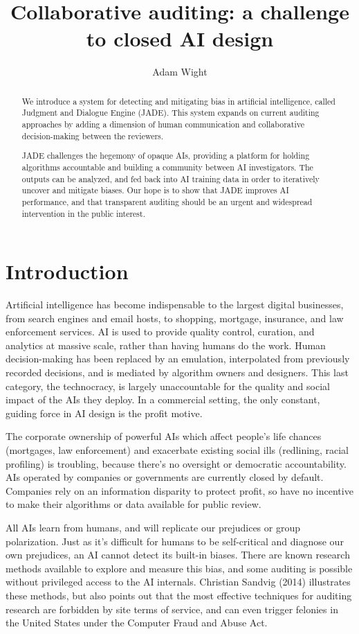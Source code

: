 \documentclass[format=sigconf, authorversion]{acmart}
\title{Collaborative auditing: a challenge to closed AI design}
\author{Adam Wight}
\affiliation{Wikimedia Foundation}
\begin{document}
\begin{abstract}
We introduce a system for detecting and mitigating bias in artificial intelligence, called Judgment and Dialogue Engine (JADE).  This system expands on current auditing approaches by adding a dimension of human communication and collaborative decision-making between the reviewers.

JADE challenges the hegemony of opaque AIs, providing a platform for holding algorithms accountable and building a community between AI investigators.  The outputs can be analyzed, and fed back into AI training data in order to iteratively uncover and mitigate biases.  Our hope is to show that JADE improves AI performance, and that transparent auditing should be an urgent and widespread intervention in the public interest.
\end{abstract}

\maketitle

\section{Introduction}

Artificial intelligence has become indispensable to the largest digital businesses, from search engines and email hosts, to shopping, mortgage, insurance, and law enforcement services.  AI is used to provide quality control, curation, and analytics at massive scale, rather than having humans do the work.  Human decision-making has been replaced by an emulation, interpolated from previously recorded decisions, and is mediated by algorithm owners and designers.  This last category, the technocracy, is largely unaccountable for the quality and social impact of the AIs they deploy.  In a commercial setting, the only constant, guiding force in AI design is the profit motive.

The corporate ownership of powerful AIs which affect people's life chances (mortgages, law enforcement) and exacerbate existing social ills (redlining, racial profiling) is troubling, because there's no oversight or democratic accountability.  AIs operated by companies or governments are currently closed by default.  Companies rely on an information disparity to protect profit, so have no incentive to make their algorithms or data available for public review.

All AIs learn from humans, and will replicate our prejudices or group polarization.  Just as it's difficult for humans to be self-critical and diagnose our own prejudices, an AI cannot detect its built-in biases.  There are known research methods available to explore and measure this bias, and some auditing is possible without privileged access to the AI internals.  Christian Sandvig (2014) illustrates these methods, but also points out that the most effective techniques for auditing research are forbidden by site terms of service, and can even trigger felonies in the United States under the Computer Fraud and Abuse Act.
\end{document}
